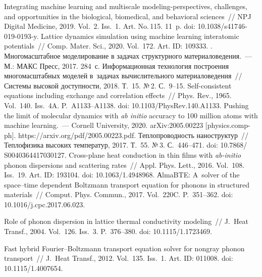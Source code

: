 \begin{multicols}{2}
{{\begin{thebibliography}{99}
      Integrating machine learning and 
multiscale modeling-perspectives, challenges, and opportunities in the biological, biomedical, and behavioral 
sciences~// NPJ Digital Medicine, 2019. Vol.~2. Iss.~1. Art. No.\,115. 11~p. doi:  
10.1038/s41746-019-0193-y.
      Lattice dynamics simulation using machine 
learning interatomic potentials~// Comp. Mater. Sci., 2020. Vol.~172. Art. ID: 109333.
. Многомасштабное моделирование в задачах структурного  
материаловедения.~--- М.: МАКС Пресс, 2017. 284~с.
      Информационная технология по\-стро\-ения многомасштабных моделей 
     в~задачах вычислительного материаловедения~// Системы высокой доступности, 2018. Т.~15. 
№\,2. С.~9--15.
      Self-consistent equations including exchange and correlation effects~// 
Phys. Rev., 1965. Vol.~140. Iss.~4A. P.~A1133--A1138. doi: 10.1103/\mbox{PhysRev}.140.A1133.
     Pushing the limit of molecular dynamics with \textit{ab initio} 
accuracy to 100 million atoms with machine learning.~--- Cornell University, 2020. arXiv:2005.00223 
[physics.comp-ph]. {\sf 
https://arxiv.org/pdf/2005.00223.pdf}.
      Теплопроводность наноструктур~// Теплофизика 
высоких температур, 2017. Т.~55. №\,3. С.~446--471. doi: 10.7868/ S0040364417030127.
      Cross-plane heat conduction in thin films with \textit{ab-initio} 
phonon dispersions and scattering rates~// Appl. Phys. Lett., 2016. Vol.~108. Iss.~19. Art. ID: 193104. doi: 
10.1063/1.4948968.
АlmaBTE: A~solver of the space--time dependent Boltzmann transport equation for phonons in structured 
materials~// Comput. Phys. Commun., 2017. Vol.~220C. P.~351--362. doi: 10.1016/j.cpc.2017.06.023.
     
 Role of phonon dispersion in lattice thermal 
conductivity modeling~// J.~Heat Transf., 2004. Vol.~126. Iss.~3. P.~376--380. doi: 10.1115/1.1723469.

 Fast hybrid Fourier--Boltzmann transport equation solver for 
nongray phonon transport~// J.~Heat Transf., 2012. Vol.~135. Iss.~1. Art. ID: 011008. doi: 
10.1115/1.4007654.


\end{thebibliography}}}
\end{multicols}
